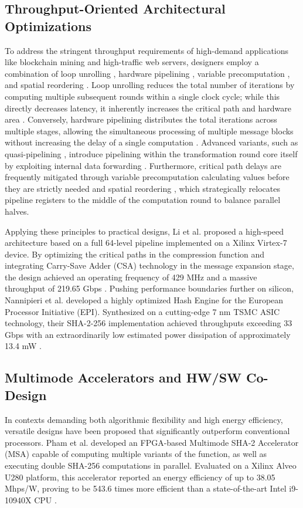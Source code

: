 \documentclass[conference]{IEEEtran}
\begin{document}
\subsection{Throughput-Oriented Architectural Optimizations}
To address the stringent throughput requirements of high-demand applications like blockchain mining and high-traffic web servers, designers employ a combination of loop unrolling \cite{crowe2004, aisopos2006}, hardware pipelining \cite{michail2009}, variable precomputation \cite{chaves2006, r3}, and spatial reordering \cite{michail2005} \cite{martino2020}. 
Loop unrolling reduces the total number of iterations by computing multiple subsequent rounds within a single clock cycle; while this directly decreases latency, it inherently increases the critical path and hardware area \cite{crowe2004, aisopos2006}. 
Conversely, hardware pipelining distributes the total iterations across multiple stages, allowing the simultaneous processing of multiple message blocks without increasing the delay of a single computation \cite{michail2009}. 
Advanced variants, such as quasi-pipelining \cite{dadda2004, macchetti2005}, introduce pipelining within the transformation round core itself by exploiting internal data forwarding \cite{martino2020}. 
Furthermore, critical path delays are frequently mitigated through variable precomputation calculating values before they are strictly needed \cite{chaves2006, r3} and spatial reordering \cite{michail2005, michail2009}, which strategically relocates pipeline registers to the middle of the computation round to balance parallel halves. 

Applying these principles to practical designs, Li et al. \cite{r2} proposed a high-speed architecture based on a full 64-level pipeline implemented on a Xilinx Virtex-7 device. By optimizing the critical paths in the compression function and integrating Carry-Save Adder (CSA) technology in the message expansion stage, the design achieved an operating frequency of 429 MHz and a massive throughput of 219.65 Gbps \cite{r2}. Pushing performance boundaries further on silicon, Nannipieri et al. \cite{nannipieri2021} developed a highly optimized Hash Engine for the European Processor Initiative (EPI). Synthesized on a cutting-edge 7 nm TSMC ASIC technology, their SHA-2-256 implementation achieved throughputs exceeding 33 Gbps with an extraordinarily low estimated power dissipation of approximately 13.4 mW \cite{nannipieri2021}. 

\subsection{Multimode Accelerators and HW/SW Co-Design}
In contexts demanding both algorithmic flexibility and high energy efficiency, versatile designs have been proposed that significantly outperform conventional processors. Pham et al. \cite{r1} developed an FPGA-based Multimode SHA-2 Accelerator (MSA) capable of computing multiple variants of the function, as well as executing double SHA-256 computations in parallel. Evaluated on a Xilinx Alveo U280 platform, this accelerator reported an energy efficiency of up to 38.05 Mhps/W, proving to be 543.6 times more efficient than a state-of-the-art Intel i9-10940X CPU \cite{r1}. 
\end{document}
